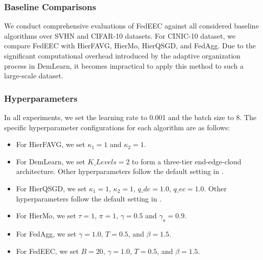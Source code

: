 \documentclass[10pt,journal]{IEEEtran}
\begin{document}
\subsubsection{Baseline Comparisons}
We conduct comprehensive evaluations of FedEEC against all considered baseline algorithms over SVHN and CIFAR-10 datasets. For CINIC-10 dataset, we compare FedEEC with HierFAVG, HierMo, HierQSGD, and FedAgg. Due to the significant computational overhead introduced by the adaptive organization process in DemLearn, it becomes impractical to apply this method to such a large-scale dataset.


\subsubsection{Hyperparameters}
In all experiments, we set the learning rate to 0.001 and the batch size to 8. The specific hyperparameter configurations for each algorithm are as follows:
\begin{itemize}
    \item 
    For HierFAVG, we set $\kappa_1=1$ and $\kappa_2=1$.
    \item 
    For DemLearn, we set $K\_{Levels}=2$ to form a three-tier end-edge-cloud architecture. Other hyperparameters follow the default setting in \cite{demlearn-code}. 
    \item 
    For HierQSGD, we set $\kappa_1=1$, $\kappa_2=1$, $q\_de=1.0$, $q\_ec=1.0$. Other hyperparameters follow the default setting in \cite{hierqsgd-code}.
    \item 
    For HierMo, we set $\tau=1$, $\pi=1$, $\gamma=0.5$ and $\gamma_a=0.9$.
    \item 
    For FedAgg, we set $\gamma=1.0$, $T=0.5$, and $\beta=1.5$.
    \item 
    For FedEEC, we set $B=20$, $\gamma=1.0$, $T=0.5$, and $\beta=1.5$.
\end{itemize}
\end{document}
